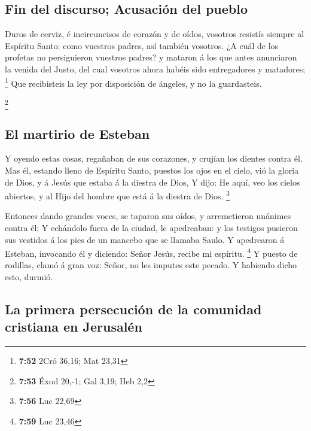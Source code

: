 \hypertarget{fin-del-discurso-acusaciuxf3n-del-pueblo}{%
\subsection{Fin del discurso; Acusación del
pueblo}\label{fin-del-discurso-acusaciuxf3n-del-pueblo}}

 Duros de cerviz, é incircuncisos de corazón y de oídos,
vosotros resistís siempre al Espíritu Santo: como vuestros padres, así
también vosotros.  ¿A cuál de los profetas no persiguieron
vuestros padres? y mataron á los que antes anunciaron la venida del
Justo, del cual vosotros ahora habéis sido entregadores y matadores;
\footnote{\textbf{7:52} 2Cró 36,16; Mat 23,31}  Que
recibisteis la ley por disposición de ángeles, y no la guardasteis.

\footnote{\textbf{7:53} Éxod 20,-1; Gal 3,19; Heb 2,2}

\hypertarget{el-martirio-de-esteban}{%
\subsection{El martirio de Esteban}\label{el-martirio-de-esteban}}

 Y oyendo estas cosas, regañaban de sus corazones, y
crujían los dientes contra él.  Mas él, estando lleno de
Espíritu Santo, puestos los ojos en el cielo, vió la gloria de Dios, y á
Jesús que estaba á la diestra de Dios,  Y dijo: He aquí,
veo los cielos abiertos, y al Hijo del hombre que está á la diestra de
Dios. \footnote{\textbf{7:56} Luc 22,69}

 Entonces dando grandes voces, se taparon sus oídos, y
arremetieron unánimes contra él;  Y echándolo fuera de la
ciudad, le apedreaban: y los testigos pusieron sus vestidos á los pies
de un mancebo que se llamaba Saulo.  Y apedrearon á
Esteban, invocando él y diciendo: Señor Jesús, recibe mi espíritu.
\footnote{\textbf{7:59} Luc 23,46}  Y puesto de rodillas,
clamó á gran voz: Señor, no les imputes este pecado. Y habiendo dicho
esto, durmió.

\hypertarget{la-primera-persecuciuxf3n-de-la-comunidad-cristiana-en-jerusaluxe9n}{%
\subsection{La primera persecución de la comunidad cristiana en
Jerusalén}\label{la-primera-persecuciuxf3n-de-la-comunidad-cristiana-en-jerusaluxe9n}}

